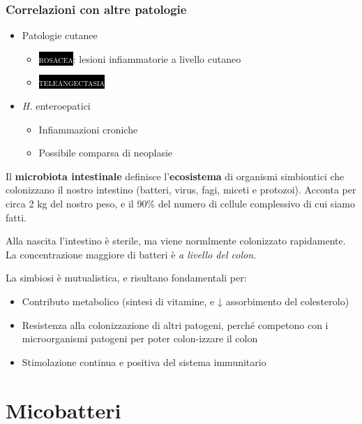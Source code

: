 \documentclass[italian,]{article}
\providecommand{\tightlist}{%
  \setlength{\itemsep}{0pt}\setlength{\parskip}{0pt}}
\newcommand{\pat}[1]{\colorbox{black}{\textcolor{white}{\textsc{#1}}}}
\newcommand{\greenbox}[2]{\begin{tcolorbox}[title=#1,colback=green!5,colframe=green!35!black]#2\end{tcolorbox}} %
\begin{document}
\hypertarget{correlazioni-con-altre-patologie}{%
\subsubsection{Correlazioni con altre
patologie}\label{correlazioni-con-altre-patologie}}

\begin{itemize}
\tightlist
\item
  Patologie cutanee

  \begin{itemize}
  \item
    \pat{rosacea}: lesioni infiammatorie a livello cutaneo
  \item
    \pat{teleangectasia}
  \end{itemize}
\item
  \emph{H.} enteroepatici

  \begin{itemize}
  \tightlist
  \item
    Infiammazioni croniche
  \item
    Possibile comparsa di neoplasie
  \end{itemize}
\end{itemize}

\greenbox{Microbiota intestinale}{
Il \textbf{microbiota intestinale} definisce l'\textbf{ecosistema} di
organismi simbiontici che colonizzano il nostro intestino (batteri,
virus, fagi, miceti e protozoi). Acconta per circa 2 kg del nostro peso,
e il 90\% del numero di cellule complessivo di cui siamo fatti.

Alla nascita l'intestino è sterile, ma viene normlmente colonizzato
rapidamente. La concentrazione maggiore di batteri è \emph{a livello del
colon}.

La simbiosi è mutualistica, e risultano fondamentali per:

\begin{itemize}
\tightlist
\item
  Contributo metabolico (sintesi di vitamine, e ↓ assorbimento del
  colesterolo)
\item
  Resistenza alla colonizzazione di altri patogeni, perché competono con
  i microorganismi patogeni per poter colon-izzare il colon
\item
  Stimolazione continua e positiva del sistema immunitario
\end{itemize}
}

\hypertarget{micobatteri}{%
\section{Micobatteri}\label{micobatteri}}
\end{document}
